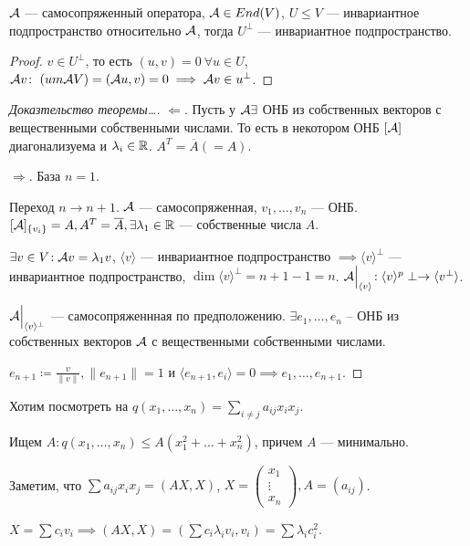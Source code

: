 \begin{statement}
    $\mathcal{A}$ --- самосопряженный оператора,  $\mathcal{A} \in End(V)$,  $U \le V$ --- инвариантное подпространство относительно $\mathcal{A}$, тогда  $U^\perp$ --- инвариантное подпространство. 
\end{statement}
\begin{proof}
    $v \in U^\perp$, то есть  $(u, v) = 0\ \forall u \in U$,  $\mathcal{A} v\!:\ (um \mathcal{A} V) = (\mathcal{A} u, v) = 0 \implies \mathcal{A} v \in u^\perp$.
\end{proof}
\begin{proof}[Доказтельство теоремы\dots]
    $\Leftarrow$. Пусть у  $\mathcal{A} \exists$ ОНБ из собственных векторов с вещественными собственными числами. То есть в некотором ОНБ $[\mathcal{A}]$ диагонализуема и  $\lambda_i \in \mathbb{R}$.  $A^T = \overline{A}(= A)$.  

    $\Rightarrow$. База $n=1$.

    Переход  $n \to n+1$.  $\mathcal{A}$ --- самосопряженная,  $v_1, \ldots, v_n$ --- ОНБ. $[\mathcal{A}]_{\{v_i\}} = A, A^T = \overline{A}, \exists \lambda_1 \in \mathbb{R}$ --- собственные числа $A$.

    $\exists v \in V\!: \mathcal{A} v = \lambda_1 v$, $\langle v \rangle$ --- инвариантное подпространство  $\implies \langle v \rangle^\perp$ --- инвариантное подпространство,  $\dim \langle v \rangle^{\perp} = n  + 1 - 1 = n$.  $\mathcal{A} \Big|_{\langle v \rangle}\!: \langle v \rangle^p\perp \to \langle v^\perp \rangle$.

    $\mathcal{A}\Big|_{\langle v \rangle^\perp}$ --- самосопряженнная по предположению.  $\exists e_1, \ldots ,e_n$ -- ОНБ из собственных векторов $\mathcal{A}$ с вещественными собственными числами.

    $e_{n+1} \coloneqq \frac{v}{\|v\|}, \|e_{n+1}\| = 1$ и $\langle e_{n+1}, e_i \rangle = 0 \implies e_1, \ldots, e_{n+1}$. 
\end{proof}

Хотим посмотреть на $q(x_1, \ldots, x_n) = \sum\limits_{i \neq j} a_{ij} x_ix_j$.

Ищем $A\!: q(x_1, \ldots, x_n) \le A(x_1^2 + \ldots + x_n^2)$, причем $A$ --- минимально.

Заметим, что  $\sum a_{ij} x_ix_j = (AX, X)$,  $X = \begin{pmatrix} x_1 \\ \vdots \\ x_n \end{pmatrix}, A = (a_{ij})$.

$X = \sum c_iv_i \implies(AX, X) = (\sum c_i \lambda_i v_i, v_i) = \sum \lambda_i c_i^2$.

